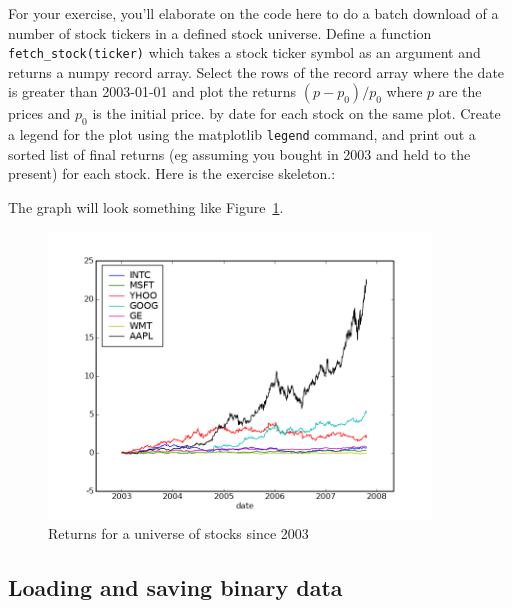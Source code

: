 For your exercise, you'll elaborate on the code here to do a batch
download of a number of stock tickers in a defined stock universe.
Define a function \texttt{fetch\_stock(ticker)} which takes a stock
ticker symbol as an argument and returns a numpy record array.  Select
the rows of the record array where the date is greater than 2003-01-01
and plot the returns $(p-p_0)/p_0$ where $p$ are the prices and $p_0$
is the initial price. by date for each stock on the same plot.  Create
a legend for the plot using the matplotlib \texttt{legend} command,
and print out a sorted list of final returns (eg assuming you bought
in 2003 and held to the present) for each stock.  Here is the exercise
skeleton.:



The graph will look something like Figure~\ref{fig:stock_records}.

\begin{center}%
\begin{figure}
\begin{centering}\includegraphics[width=4in]{fig/stock_records}\par\end{centering}


\caption{\label{fig:stock_records}Returns for a universe of stocks
  since 2003}
\end{figure}
\par\end{center}


\subsection{Loading and saving binary data}
\label{sec:binary_data}

